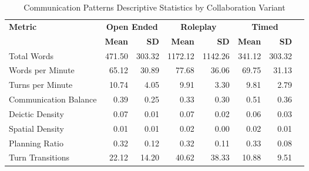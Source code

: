 \begin{table}[htbp]
\centering
\caption{Communication Patterns Descriptive Statistics by Collaboration Variant}
\label{tab:communication_descriptive_stats}
\begin{tabular}{lrrrrrrr}
\toprule
\textbf{Metric} & \multicolumn{2}{c}{\textbf{Open Ended}} & \multicolumn{2}{c}{\textbf{Roleplay}} & \multicolumn{2}{c}{\textbf{Timed}} \\
& \textbf{Mean} & \textbf{SD} & \textbf{Mean} & \textbf{SD} & \textbf{Mean} & \textbf{SD} \\
\midrule
Total Words & 471.50 & 303.32 & 1172.12 & 1142.26 & 341.12 & 303.32 \\
Words per Minute & 65.12 & 30.89 & 77.68 & 36.06 & 69.75 & 31.13 \\
Turns per Minute & 10.74 & 4.05 & 9.91 & 3.30 & 9.81 & 2.79 \\
Communication Balance & 0.39 & 0.25 & 0.33 & 0.30 & 0.51 & 0.36 \\
Deictic Density & 0.07 & 0.01 & 0.07 & 0.02 & 0.06 & 0.03 \\
Spatial Density & 0.01 & 0.01 & 0.02 & 0.00 & 0.02 & 0.01 \\
Planning Ratio & 0.32 & 0.12 & 0.32 & 0.11 & 0.33 & 0.08 \\
Turn Transitions & 22.12 & 14.20 & 40.62 & 38.33 & 10.88 & 9.51 \\
\bottomrule
\end{tabular}
\end{table}